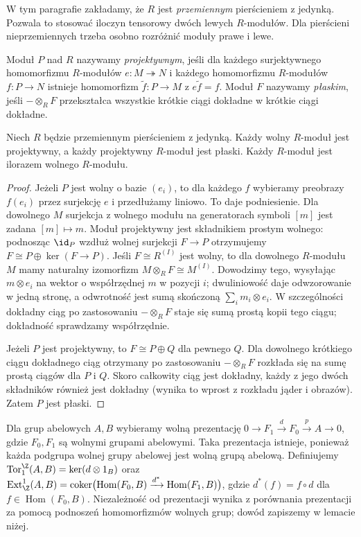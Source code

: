 W tym paragrafie zakładamy, że $R$ jest \emph{przemiennym}
pierścieniem z jedynką. Pozwala to stosować
iloczyn tensorowy dwóch lewych $R$-modułów.
Dla pierścieni nieprzemiennych trzeba osobno
rozróżnić moduły prawe i lewe.
\begin{definicja}
Moduł $P$ nad $R$ nazywamy \emph{projektywnym}, jeśli dla
każdego surjektywnego homomorfizmu $R$-modułów
$e:M\twoheadrightarrow N$ i każdego homomorfizmu
$R$-modułów $f:P\to N$ istnieje homomorfizm
$\widetilde f:P\to M$ z $e\widetilde f=f$.
Moduł $F$ nazywamy \emph{płaskim}, jeśli
$-\otimes_RF$ przekształca wszystkie krótkie ciągi dokładne
w krótkie ciągi dokładne.
\end{definicja}
\begin{stwierdzenie}
Niech $R$ będzie przemiennym pierścieniem z jedynką.
Każdy wolny $R$-moduł jest projektywny, a każdy
projektywny $R$-moduł jest płaski. Każdy $R$-moduł
jest ilorazem wolnego $R$-modułu.
\end{stwierdzenie}
\begin{proof}
Jeżeli $P$ jest wolny o bazie $(e_i)$, to dla każdego $f$
wybieramy preobrazy $f(e_i)$ przez surjekcję $e$ i przedłużamy
liniowo. To daje podniesienie. Dla dowolnego $M$ surjekcja
z wolnego modułu na generatorach symboli $[m]$ jest zadana
$[m]\mapsto m$. Moduł projektywny jest składnikiem prostym
wolnego: podnosząc $\id_P$ wzdłuż wolnej surjekcji $F\to P$
otrzymujemy $F\cong P\oplus\ker(F\to P)$.
Jeśli $F\cong R^{(I)}$ jest wolny, to dla dowolnego
$R$-modułu $M$ mamy naturalny izomorfizm
$M\otimes_RF\cong M^{(I)}$.
Dowodzimy tego, wysyłając $m\otimes e_i$ na
wektor o współrzędnej $m$ w pozycji $i$;
dwuliniowość daje odwzorowanie w jedną stronę,
a odwrotność jest sumą skończoną
$\sum_i m_i\otimes e_i$. W szczególności
dokładny ciąg po zastosowaniu $-\otimes_RF$
staje się sumą prostą kopii tego ciągu;
dokładność sprawdzamy współrzędnie.

Jeżeli $P$ jest projektywny, to
$F\cong P\oplus Q$ dla pewnego $Q$.
Dla dowolnego krótkiego ciągu dokładnego
ciąg otrzymany po zastosowaniu $-\otimes_RF$
rozkłada się na sumę prostą ciągów dla $P$ i $Q$.
Skoro całkowity ciąg jest dokładny, każdy z jego
dwóch składników również jest dokładny
(wynika to wprost z rozkładu jąder i obrazów).
Zatem $P$ jest płaski.
\end{proof}
\begin{definicja}
Dla grup abelowych $A,B$ wybieramy wolną prezentację
$0\to F_1\xrightarrow{d}F_0\xrightarrow{p}A\to0$,
gdzie $F_0,F_1$ są wolnymi grupami abelowymi.
Taka prezentacja istnieje, ponieważ każda podgrupa
wolnej grupy abelowej jest wolną grupą abelową.
Definiujemy
$\operatorname{Tor}_1^{\Z}(A,B)=\ker(d\otimes1_B)$ oraz
$\operatorname{Ext}^1_{\Z}(A,B)=\operatorname{coker}
\bigl(\operatorname{Hom}(F_0,B)\xrightarrow{d^*}
\operatorname{Hom}(F_1,B)\bigr)$,
gdzie $d^*(f)=f\circ d$ dla $f\in\operatorname{Hom}(F_0,B)$.
Niezależność od prezentacji wynika z porównania prezentacji
za pomocą podnoszeń homomorfizmów wolnych grup; dowód
zapiszemy w lemacie niżej.
\end{definicja}
